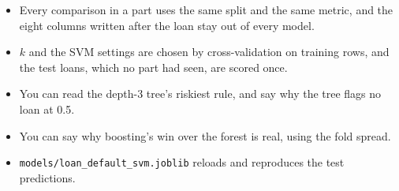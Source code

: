 \begin{labchecklists}
\begin{verification}
\begin{itemize}
  \item Every comparison in a part uses the same split and the same metric, and the eight columns written after the loan stay out of every model.
  \item $k$ and the SVM settings are chosen by cross-validation on training rows, and the test loans, which no part had seen, are scored once.
  \item You can read the depth-3 tree's riskiest rule, and say why the tree flags no loan at 0.5.
  \item You can say why boosting's win over the forest is real, using the fold spread.
  \item \texttt{models/loan\_default\_svm.joblib} reloads and reproduces the test predictions.
\end{itemize}
\end{verification}
\end{labchecklists}
